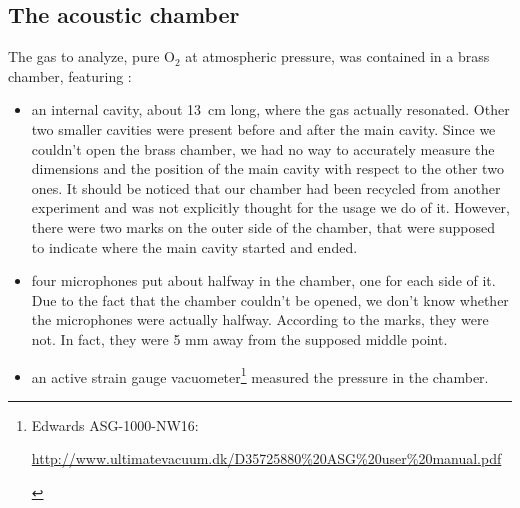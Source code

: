 \documentclass[a4paper, 11pt]{article}
\begin{document}
\subsection{The acoustic chamber} 
 The gas to analyze, pure O$_2$ at atmospheric pressure, was contained in a brass chamber, featuring :
\begin{itemize}
\item an internal cavity, about \mbox{13 cm} long, where the gas actually resonated. Other two smaller cavities were present before and after the main cavity. Since we couldn't open the brass chamber, we had no way to accurately measure the dimensions and the position of the main cavity with respect to the other two ones. It should be noticed that our chamber had been recycled from another experiment and was not explicitly thought for the usage we do of it. However, there were two marks on the outer side of the chamber, that were supposed to indicate where the main cavity started and ended.
\item four microphones put about halfway in the chamber, one for each side of it. Due to the fact that the chamber couldn't be opened, we don't know whether the microphones were actually halfway. According to the marks, they were not. In fact, they were 5 mm away from the supposed middle point.
\item an active strain gauge vacuometer\footnote{Edwards ASG-1000-NW16:\vspace{-10pt}
\begin{flushright} \url{http://www.ultimatevacuum.dk/D35725880\%20ASG\%20user\%20manual.pdf}
\end{flushright}} measured the pressure in the chamber. 
\end{itemize}

\newpage
\appendix



\newpage
\end{document}

